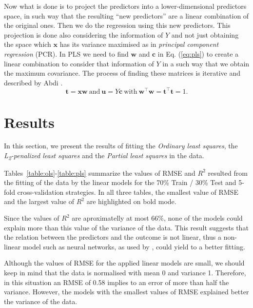 \documentclass[conference]{IEEEtran}
\begin{document}
Now what is done is to project the predictors into a lower-dimensional predictors space, in such way that the resulting ``new predictors'' are a linear combination of the original ones. Then we do the regression using this new predictors. This projection is done also considering the information of $Y$ and not just obtaining the space which $\mathbf{x}$ has its variance maximised as in \emph{principal component regression} (PCR). In PLS we need to find $\mathbf{w}$ and $\mathbf{c}$ in Eq. (\ref{eq:pls}) to create a linear combination to consider that information of $Y$ in a such way that we obtain the maximum covariance. The process of finding these matrices is iterative and described by Abdi \cite{b5}.
%
\begin{equation}
\mathbf{t} = \mathbf{x}\mathbf{w}\ \text{and}\ \mathbf{u}=Y\mathbf{c}\ \text{with}\ \textbf{w}^\top\textbf{w}=\textbf{t}^\top\textbf{t}=1.
\label{eq:pls}
\end{equation}

\section{Results} \label{sec:results}

In this section, we present the results of fitting the \emph{Ordinary least squares}, the \emph{L\textsubscript{2}-penalized least squares} and the \emph{Partial least squares} in the data.

Tables~\ref{table:ols}-\ref{table:pls} summarize the values of RMSE and $R^2$ resulted from the fitting of the data by the linear models for the 70\% Train / 30\% Test and 5-fold cross-validation strategies. In all three tables, the smallest value of RMSE and the largest value of $R^2$ are highlighted on bold mode.

Since the values of $R^2$ are aproximatelly at most 66\%, none of the models could explain more than this value of the variance of the data. This result suggests that the relation between the predictors and the outcome is not linear, thus a non-linear model such as neural networks, as used by \cite{b4}, could yield to a better fitting. 

Although the values of RMSE for the applied linear models are small, we should keep in mind that the data is normalised with mean 0 and variance 1. Therefore, in this situation an RMSE of 0.58 implies to an error of more than half the variance. However, the models with the smallest values of RMSE explained better the variance of the data.
\end{document}
